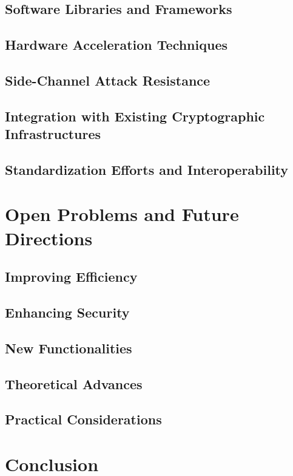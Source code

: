 \documentclass{iacrcc}
\begin{document}
\subsection{Software Libraries and Frameworks}
\subsection{Hardware Acceleration Techniques}
\subsection{Side-Channel Attack Resistance}
\subsection{Integration with Existing Cryptographic Infrastructures}
\subsection{Standardization Efforts and Interoperability}

\section{Open Problems and Future Directions}
\subsection{Improving Efficiency}
\subsection{Enhancing Security}
\subsection{New Functionalities}
\subsection{Theoretical Advances}
\subsection{Practical Considerations}

\section{Conclusion}

\pagebreak


\end{document}
